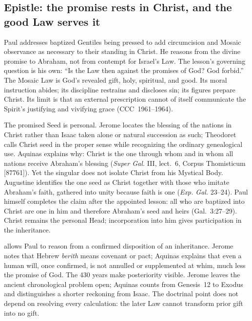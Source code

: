 \subsection*{Epistle: the promise rests in Christ, and the good Law serves it\enspace{}}

Paul addresses baptized Gentiles being pressed to add circumcision and Mosaic
observance as necessary to their standing in Christ. He reasons from the divine
promise to Abraham, not from contempt for Israel's Law. The lesson's governing
question is his own: ``Is the Law then against the promises of God? God forbid.''
The Mosaic Law is God's revealed gift, holy, spiritual, and good. Its moral
instruction abides; its discipline restrains and discloses sin; its figures
prepare Christ. Its limit is that an external prescription cannot of itself
communicate the Spirit's justifying and vivifying grace (CCC~1961--1964).

The promised Seed is personal. Jerome locates the blessing of the nations in
Christ rather than Isaac taken alone or natural succession as such; Theodoret
calls Christ seed in the proper sense while recognizing the ordinary
genealogical use. Aquinas explains why: Christ is the one through whom and in
whom all nations receive Abraham's blessing (\emph{Super Gal.} III, lect.~6,
Corpus Thomisticum [87761]). Yet the singular does not isolate Christ from his Mystical Body.
Augustine identifies the one seed as Christ together with those who imitate
Abraham's faith, gathered into unity because faith is one (\emph{Exp. Gal.}
23--24). Paul himself completes the claim after the appointed lesson: all who
are baptized into Christ are one in him and therefore Abraham's seed and heirs
(Gal.~3:27--29). Christ remains the personal Head; incorporation into him gives
participation in the inheritance.

 allows Paul to reason from a confirmed disposition of an
inheritance. Jerome notes that Hebrew \emph{berith} means covenant or pact;
Aquinas explains that even a human will, once confirmed, is not annulled or
supplemented at whim, much less the promise of God. The 430 years make
posteriority visible. Jerome leaves the ancient chronological problem open;
Aquinas counts from Genesis~12 to Exodus and distinguishes a shorter reckoning
from Isaac. The doctrinal point does not depend on resolving every calculation:
the later Law cannot transform prior gift into no gift.

